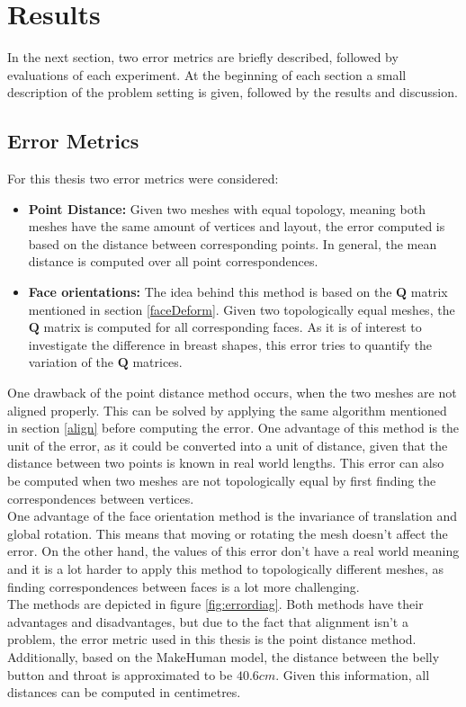 \chapter{Results}
In the next section, two error metrics are briefly described, followed by evaluations of each experiment. At the beginning of each section a small description of the problem setting is given, followed by the results and discussion.

\section{Error Metrics}
\label{Emetrics}
For this thesis two error metrics were considered:
\begin{itemize}
  \item \textbf{Point Distance:} Given two meshes with equal topology, meaning both meshes have the same amount of vertices and layout, the error computed is based on the distance between corresponding points. In general, the mean distance is computed over all point correspondences.
  \item \textbf{Face orientations:} The idea behind this method is based on the $\mathbf{Q}$ matrix mentioned in section \ref{faceDeform}. Given two topologically equal meshes, the $\mathbf{Q}$ matrix is computed for all corresponding faces. As it is of interest to investigate the difference in breast shapes, this error tries to quantify the variation of the $\mathbf{Q}$ matrices.
\end{itemize}

One drawback of the point distance method occurs, when the two meshes are not aligned properly. This can be solved by applying the same algorithm mentioned in section \ref{align} before computing the error. One advantage of this method is the unit of the error, as it could be converted into a unit of distance, given that the distance between two points is known in real world lengths. This error can also be computed when two meshes are not topologically equal by first finding the correspondences between vertices.\\
One advantage of the face orientation method is the invariance of translation and global rotation. This means that moving or rotating the mesh doesn't affect the error. On the other hand, the values of this error don't have a real world meaning and it is a lot harder to apply this method to topologically different meshes, as finding correspondences between faces is a lot more challenging.\\
The methods are depicted in figure \ref{fig:errordiag}. Both methods have their advantages and disadvantages, but due to the fact that alignment isn't a problem, the error metric used in this thesis is the point distance method. Additionally, based on the MakeHuman model, the distance between the belly button and throat is approximated to be $40.6cm$. Given this information, all distances can be computed in centimetres.

